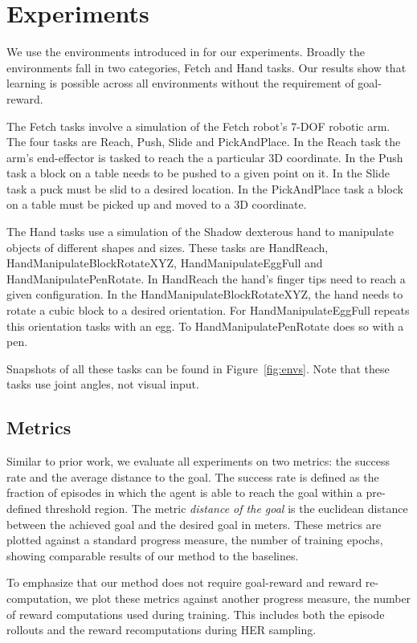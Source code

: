 \section{Experiments}
\label{sec:experiments}
We use the environments introduced in \citet{plappert2018multi} for our experiments.
Broadly the environments fall in two categories, Fetch and Hand tasks.
Our results show that learning is possible across all environments
without the requirement of goal-reward.

The Fetch tasks involve a simulation of the Fetch robot's 7-DOF robotic arm. The four tasks are Reach, Push,
Slide and PickAndPlace.
In the Reach task the arm's end-effector is tasked to reach the a particular 3D coordinate. 
In the Push task a block on a table needs to be pushed to a given point on it.
In the Slide task a puck must be slid to a desired location.
In the PickAndPlace task a block on a table must be picked up and moved to a
3D coordinate.

The Hand tasks use a simulation of the Shadow dexterous hand to manipulate objects of
different shapes and sizes. These tasks are HandReach,
HandManipulateBlockRotateXYZ, HandManipulateEggFull and HandManipulatePenRotate.
In HandReach the hand's finger tips need to reach a given configuration.
In the HandManipulateBlockRotateXYZ, the hand needs to rotate a cubic
block to a desired orientation.
For HandManipulateEggFull repeats this orientation tasks with an egg.
To HandManipulatePenRotate does so with a pen.

Snapshots of all these tasks can be found in Figure~\ref{fig:envs}. Note that
these tasks use joint angles, not visual input.


\subsection{Metrics}
Similar to prior work, we evaluate all experiments on two metrics: the success
rate and the average distance to the goal. The success rate is defined as the
fraction of episodes in which the agent is able to reach the goal within a
pre-defined threshold region.
The metric \emph{distance of the goal} is the euclidean distance between
the achieved goal and the desired goal in meters.
These metrics are plotted against a standard progress measure, the
number of training epochs, showing
comparable results of our method to the baselines.

To emphasize that our method does not require goal-reward
and reward re-computation, we plot these metrics against another
progress measure, the number of reward computations used during
training. This includes both the episode rollouts and the reward recomputations
during HER sampling.

